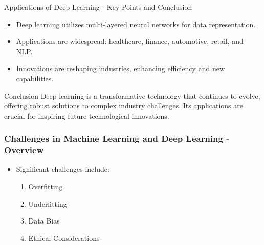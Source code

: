\documentclass[aspectratio=169]{beamer}
\begin{document}
\begin{frame}[fragile]{Applications of Deep Learning - Key Points and Conclusion}
    \begin{itemize}
        \item Deep learning utilizes multi-layered neural networks for data representation.
        \item Applications are widespread: healthcare, finance, automotive, retail, and NLP.
        \item Innovations are reshaping industries, enhancing efficiency and new capabilities.
    \end{itemize}

    \begin{block}{Conclusion}
        Deep learning is a transformative technology that continues to evolve, offering robust solutions to complex industry challenges. Its applications are crucial for inspiring future technological innovations.
    \end{block}
\end{frame}

\begin{frame}[fragile]
    \frametitle{Challenges in Machine Learning and Deep Learning - Overview}
    \begin{itemize}
        \item Significant challenges include:
        \begin{enumerate}
            \item Overfitting
            \item Underfitting
            \item Data Bias
            \item Ethical Considerations
        \end{enumerate}
    \end{itemize}
\end{frame}
\end{document}
